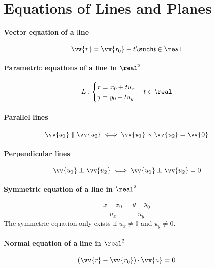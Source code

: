 \section{Equations of Lines and Planes}
\paragraph{Vector equation of a line}
	\begin{equation}
		\vv{r}= \vv{r_0} + t \such t \in \real
	\end{equation}
\paragraph{Parametric equations of a line in $\real^2$}
	\begin{equation}
		L:
		\begin{cases}
			x = x_0 + tu_x\\
			y = y_0 + tu_y
		\end{cases}
		t \in \real
	\end{equation}
\paragraph{Parallel lines}
	\begin{equation}
		\vv{u_1} \parallel \vv{u_2} \iff \vv{u_1} \times \vv{u_2} = \vv{0}
	\end{equation}
\paragraph{Perpendicular lines}
	\begin{equation}
		\vv{u_1} \perp \vv{u_2} \iff \vv{u_1} \perp \vv{u_2} = 0
	\end{equation}
\paragraph{Symmetric equation of a line in $\real^2$}
	\begin{equation}
		\frac{x-x_0}{u_x} = \frac{y-y_0}{u_y}
	\end{equation}
	The symmetric equation only exists if $u_x \neq 0$ and $u_y \neq 0$.
\paragraph{Normal equation of a line in $\real^2$}
	\begin{equation}
		\left( \vv{r} - \vv{r_0} \right) \cdot \vv{n} = 0
	\end{equation}
